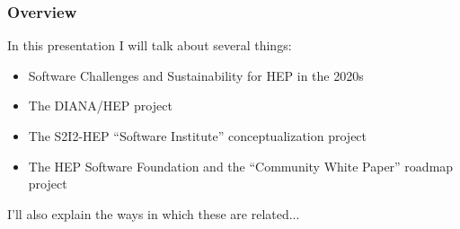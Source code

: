 \begin{frame}
\frametitle{Overview}

In this presentation I will talk about several things:

\begin{itemize}
\item Software Challenges and Sustainability for HEP in the 2020s
\item The DIANA/HEP project
\item The S2I2-HEP ``Software Institute'' conceptualization project
\item The HEP Software Foundation and the ``Community White Paper'' roadmap project
\end{itemize}

I'll also explain the ways in which these are related...

\end{frame}


